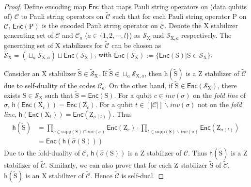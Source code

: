 \documentclass[reprint,aps,twocolumn,superscriptaddress,showpacs,notitlepage,10pt]{revtex4-2}
\theoremstyle{definition}
\begin{document}
\begin{proof}
    Define encoding map $\mathsf{Enc}$ that maps Pauli string operators on (data qubits of) $\mathcal{C}$ to Pauli string operators on $\tilde{\mathcal{C}}$ such that for each Pauli string operator $\mathrm{P}$ on $\mathcal{C}$, $\mathsf{Enc}(\mathrm{P})$ is the encoded Pauli string operator on $\tilde{\mathcal{C}}$. Denote the X stabilizer generating set of $\mathcal{C}$ and $\mathcal{C}_a$ ($a\in\{1,2,\cdots,l\}$) as $\mathcal{S}_{\mathrm{X}}$ and $\mathcal{S}_{\mathrm{X},a}$ respectively. The generating set of X stabilizers for $\tilde{\mathcal{C}}$ can be chosen as $\tilde{\mathcal{S}}_{\mathrm{X}}=(\sqcup_{a}\mathcal{S}_{\mathrm{X},a})\sqcup \mathsf{Enc}(\mathcal{S}_{\mathrm{X}})$, with $\mathsf{Enc}(\mathcal{S}_{\mathrm{X}}):=\{\mathsf{Enc}(\mathrm{S})|\mathrm{S}\in\mathcal{S}_{\mathrm{X}}\}$.  

Consider an X stabilizer $\tilde{\mathrm{S}}\in\tilde{\mathcal{S}}_{\mathrm{X}}$. If $\tilde{\mathrm{S}}\in\sqcup_{a}\mathcal{S}_{\mathrm{X},a}$, then $\mathrm{h}(\tilde{\mathrm{S}})$ is a $\mathrm{Z}$ stabilizer of $\tilde{\mathcal{C}}$ due to self-duality of the codes $\mathcal{C}_{a}$. On the other hand, if $\tilde{\mathrm{S}}\in\mathsf{Enc}(\mathcal{S}_{\mathrm{X}})$, there exists $\mathrm{S}\in\mathcal{S}_{\mathrm{X}}$ such that $\tilde{\mathrm{S}}=\mathsf{Enc}(\mathrm{S})$. For a qubit $c\in inv(\sigma)$ on the \textit{fold line} of $\sigma$, $\mathsf{h}(\mathsf{Enc}(\mathrm{X}_{c}))=\mathsf{Enc}(\mathrm{Z}_{c})$. For a qubit $t\in[|\mathcal{C}|]\backslash inv(\sigma)$ not on the \textit{fold line}, $\mathsf{h}(\mathsf{Enc}(\mathrm{X}_{t}))=\mathsf{Enc}(\mathrm{Z}_{\sigma(t)})$. Thus
\begin{align}
\mathsf{h}(\tilde{\mathrm{S}}) &= \prod_{c\in\mathrm{supp}(\mathrm{S})\cap inv(\sigma)} \mathsf{Enc}(\mathrm{Z}_{c}) \cdot \prod_{t\in\mathrm{supp}(\mathrm{S})\backslash inv(\sigma)} \mathsf{Enc}(\mathrm{Z}_{\sigma(t)}) \nonumber \\
&= \mathsf{Enc}(\mathsf{h}(\hat{\sigma}(\mathrm{S}))) 
\end{align}
Due to the fold-duality of $\mathcal{C}$, $\mathsf{h}(\hat{\sigma}(\mathrm{S}))$ is a $\mathrm{Z}$ stabilizer of $\mathcal{C}$. Thus $\mathsf{h}(\tilde{\mathrm{S}})$ is a $\mathrm{Z}$ stabilizer of $\tilde{\mathcal{C}}$. Similarly, we can also prove that for each $\mathrm{Z}$ stabilizer $\tilde{\mathrm{S}}$ of $\tilde{\mathcal{C}}$, $\mathrm{h}(\tilde{\mathrm{S}})$ is an $\mathrm{X}$ stabilizer of $\tilde{\mathcal{C}}$. Hence $\tilde{\mathcal{C}}$ is self-dual.  
\end{proof}
\end{document}
